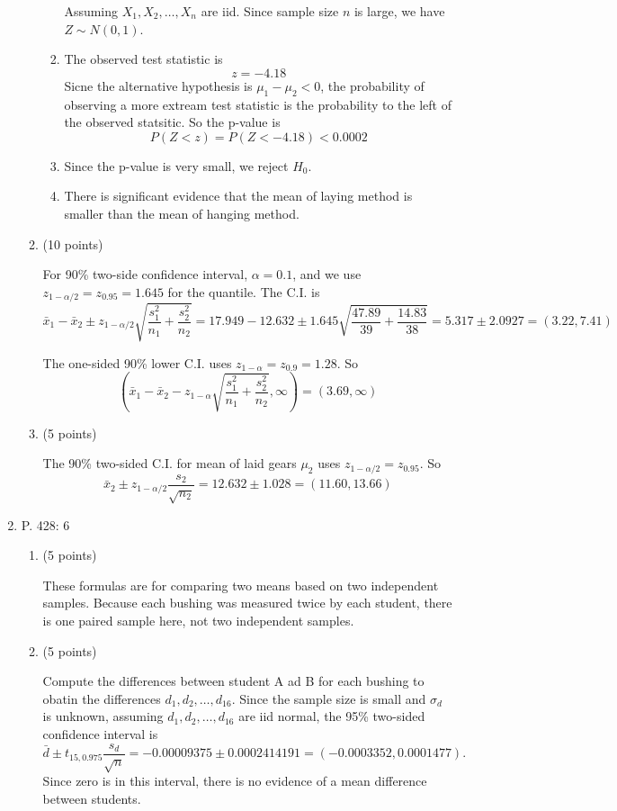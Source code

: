 \documentclass{article}\usepackage[]{graphicx}\usepackage[]{color}
\begin{document}
\begin{enumerate}
\begin{enumerate}
\begin{enumerate}[label=\arabic*.]
	Assuming $X_1, X_2, \ldots, X_n$ are iid. Since sample size $n$ is large, we have $Z \sim N(0,1)$.

	\item The observed test statistic is
	\[z = -4.18\]
	Sicne the alternative hypothesis is $\mu_1 - \mu_2 < 0$, the probability of observing a more extream test statistic is the probability to the left of the observed statsitic. So the p-value is
	\[P(Z < z) =  P(Z < -4.18)  < 0.0002\]
	\item Since the p-value is very small, we reject $H_0$.
	\item There is significant evidence that the mean of laying method is smaller than the mean of hanging method.
	\end{enumerate}

	\item (10 points)
	
  For 90\% two-side confidence interval, $\alpha = 0.1$, and we use $z_{1 - \alpha/2} = z_{0.95} = 1.645$ for the quantile. The C.I. is
  \[\bar{x}_1 - \bar{x}_2 \pm z_{1 - \alpha/2} \sqrt{\frac{s_1^2}{n_1} + \frac{s_2^2}{n_2}} = 17.949 - 12.632 \pm 1.645 \sqrt{\frac{47.89}{39} + \frac{14.83}{38}} = 5.317 \pm 2.0927 = (3.22, 7.41)\]
  
  The one-sided 90\% lower C.I. uses $z_{1 - \alpha} = z_{0.9} = 1.28$. So 
  \[\left(\bar{x}_1 - \bar{x}_2 - z_{1 - \alpha}\sqrt{\frac{s_1^2}{n_1} + \frac{s_2^2}{n_2}}, \infty\right) = (3.69, \infty)\]

	\item (5 points)
	
	The 90\% two-sided C.I. for mean of laid gears $\mu_2$ uses $z_{1 - \alpha/2} = z_{0.95}$. So
	\[\bar{x}_2 \pm z_{1 - \alpha/2} \frac{s_2}{\sqrt{n_2}} = 12.632 \pm 1.028 = (11.60, 13.66)\]
	\end{enumerate}
	\item P. 428: 6
	\begin{enumerate}
	\item (5 points)
	
	These formulas are for comparing two means based on two independent samples. Because each bushing was measured twice by each student, there is one paired sample here, not two independent samples.
	\item (5 points)
	
	Compute the differences between student A ad B for each bushing to obatin the differences $d_1, d_2, \ldots, d_{16}$. Since the sample size is small and $\sigma_d$ is unknown, assuming $d_1, d_2, 
	\ldots, d_{16}$ are iid normal, the 95\% two-sided confidence interval is
	\[\bar{d} \pm t_{15, 0.975} \frac{s_d}{\sqrt{n}} = -0.00009375 \pm 0.0002414191 = (-0.0003352, 0.0001477).\]
	Since zero is in this interval, there is no evidence of a mean difference between students.
	\end{enumerate}
 \end{enumerate}
% 
%
\end{document}
